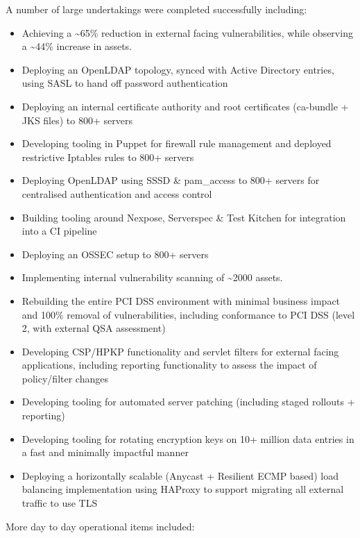 A number of large undertakings were completed successfully including:

\begin{itemize}
\tightlist
\item
  Achieving a \textasciitilde{}65\% reduction in external facing
  vulnerabilities, while observing a \textasciitilde{}44\% increase in
  assets.
\item
  Deploying an OpenLDAP topology, synced with Active Directory entries,
  using SASL to hand off password authentication
\item
  Deploying an internal certificate authority and root certificates
  (ca-bundle + JKS files) to 800+ servers
\item
  Developing tooling in Puppet for firewall rule management and deployed
  restrictive Iptables rules to 800+ servers
\item
  Deploying OpenLDAP using SSSD \& pam\_access to 800+ servers for
  centralised authentication and access control
\item
  Building tooling around Nexpose, Serverspec \& Test Kitchen for
  integration into a CI pipeline
\item
  Deploying an OSSEC setup to 800+ servers
\item
  Implementing internal vulnerability scanning of \textasciitilde{}2000
  assets.
\item
  Rebuilding the entire PCI DSS environment with minimal business impact
  and 100\% removal of vulnerabilities, including conformance to PCI DSS
  (level 2, with external QSA assessment)
\item
  Developing CSP/HPKP functionality and servlet filters for external
  facing applications, including reporting functionality to assess the
  impact of policy/filter changes
\item
  Developing tooling for automated server patching (including staged
  rollouts + reporting)
\item
  Developing tooling for rotating encryption keys on 10+ million data
  entries in a fast and minimally impactful manner
\item
  Deploying a horizontally scalable (Anycast + Resilient ECMP based)
  load balancing implementation using HAProxy to support migrating all
  external traffic to use TLS
\end{itemize}

More day to day operational items included:

